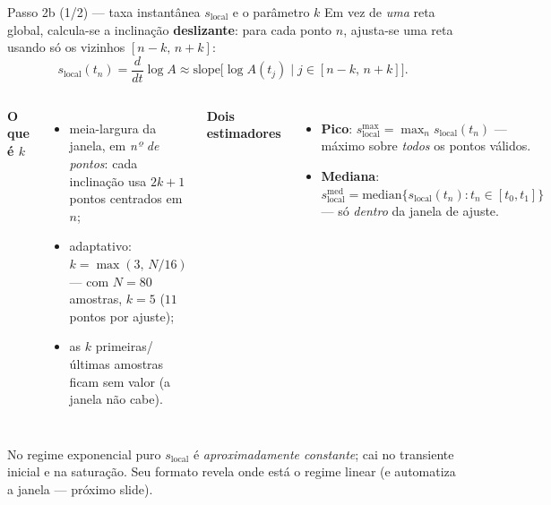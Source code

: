 \documentclass[aspectratio=169,11pt]{beamer}
\newcommand{\sloc}{s_{\mathrm{local}}}
\newcommand{\slocmax}{s_{\mathrm{local}}^{\max}}
\newcommand{\slocmed}{s_{\mathrm{local}}^{\mathrm{med}}}
\begin{document}
\begin{frame}{Passo 2b (1/2) — taxa instantânea $\sloc$ e o parâmetro $k$}
  Em vez de \emph{uma} reta global, calcula-se a inclinação \textbf{deslizante}:
  para cada ponto $n$, ajusta-se uma reta usando só os vizinhos $[n-k,\,n+k]$:
  \begin{equation*}
    \sloc(t_n) = \frac{d}{dt}\log A
    \approx \mathrm{slope}\big[\log A(t_j)\;|\;j\in[n-k,\,n+k]\big].
  \end{equation*}
  \begin{columns}[T]
    \textbf{O que é $k$}\\[0.2em]
    \footnotesize
    \begin{itemize}
      \item meia-largura da janela, em \emph{nº de pontos}: cada inclinação usa
            $2k+1$ pontos centrados em $n$;
      \item adaptativo: $k=\max(3,\,N/16)$ — com $N=80$ amostras, $k=5$
            ($11$ pontos por ajuste);
      \item as $k$ primeiras/últimas amostras ficam sem valor (a janela não cabe).
    \end{itemize}
    \textbf{Dois estimadores}\\[0.2em]
    \footnotesize
    \begin{itemize}
      \item \textbf{Pico}: $\slocmax = \max_n \sloc(t_n)$ — máximo sobre
            \emph{todos} os pontos válidos.
      \item \textbf{Mediana}: $\slocmed = \mathrm{median}\{\sloc(t_n):t_n\in[t_0,t_1]\}$
            — só \emph{dentro} da janela de ajuste.
    \end{itemize}
  \end{columns}
  \vspace{0.3em}
  \footnotesize
  No regime exponencial puro $\sloc$ é \emph{aproximadamente constante}; cai no
  transiente inicial e na saturação. Seu formato revela onde está o regime linear
  (e automatiza a janela — próximo slide).
\end{frame}
\end{document}
